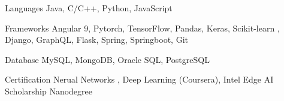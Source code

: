 
\begin{cvskills}
  \cvskill
    {Languages} %
    {Java, C/C++, Python, JavaScript} %

  \cvskill
    {Frameworks} %
    {Angular 9, Pytorch, TensorFlow, Pandas, Keras, Scikit-learn , Django, GraphQL, Flask, Spring, Springboot, Git} %
    
    \cvskill
    {Database} %
    {MySQL, MongoDB, Oracle SQL, PostgreSQL} %
    
 
    
    \cvskill
    {Certification} %
    {Nerual Networks , Deep Learning (Coursera), Intel Edge AI Scholarship Nanodegree} %
\end{cvskills}
